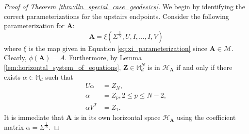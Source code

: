 \documentclass{amsart}
\theoremstyle{definition}
\theoremstyle{remark}
\numberwithin{equation}{section}
\begin{document}
\begin{proof}[Proof of Theorem \ref{thm:dln_special_case_geodesics}]
    We begin by identifying the correct parameterizations for the upstairs endpoints. Consider the following parameterization for $\mathbf{A}$:
    \begin{equation}\label{eq:underline_A_parameterization}
        \mathbf{A} = \xi \left(\Sigma^\frac{1}{N}, U, I, \ldots, I, V\right)
    \end{equation}
    where $\xi$ is the map given in Equation \ref{eq:xi_parameterization} since $\mathbf{A} \in \mathcal{M}$. Clearly, $\phi(\mathbf{A}) = A$. %
    Furthermore, by Lemma \ref{lem:horizontal_system_of_equations}, $\mathbf{Z} \in \mathbb{M}_d^N$ is in $\mathcal{H}_\mathbf{A}$ if and only if there exists $\alpha \in \mathbb{M}_d$ such that
    \begin{align}
        U\alpha &= Z_N,\\
        \alpha &= Z_p, 2 \leq p \leq N-2, \\
        \alpha V^T &= Z_1.
    \end{align}
    It is immediate that $\mathbf{A}$ is in its own horizontal space $\mathcal{H}_\mathbf{A}$ using the coefficient matrix $\alpha = \Sigma^\frac{1}{N}$.
    

\end{proof}
\end{document}
